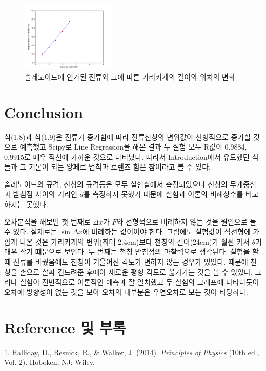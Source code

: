 \documentclass[a4paper]{article}
\begin{document}
		\begin{figure}[h]
			\centering
			\includegraphics[width=0.4\textwidth]{img/figure_2.png}
			\vspace{-0.5cm}
			\caption{솔레노이드에 인가된 전류와 그에 따른 가리키게의 길이와 위치의 변화}
		\end{figure}

	

\newpage




	\section{Conclusion}
	식(1.8)과 식(1.9)은 전류가 증가함에 따라 전류천칭의 변위값이 선형적으로 증가할 것으로 예측했고 Scipy로 Line Regression을 해본 결과 두 실험 모두 R값이 0.9884, 0.9915로 매우 직선에 가까운 것으로 나타났다.
	따라서 Introduction에서 유도했던 식들과 그 기본이 되는 앙페르 법칙과 로렌츠 힘은 참이라고 볼 수 있다. 

	솔레노이드의 규격, 천칭의 규격등은 모두 실험실에서 측정되었으나 천칭의 무게중심과 받침점 사이의 거리인 $d$를 측정하지 못했기 때문에 실험과 이론의 비례상수를 비교하지는 못했다. 

	오차분석을 해보면 첫 번째로 $\Delta{}x$가 $F$와 선형적으로 비례하지 않는 것을 원인으로 들 수 있다. 실제로는 $\sin{\Delta{}x}$에 비례하는 값이어야 한다.
	그럼에도 실험값이 직선형에 가깝게 나온 것은 가리키게의 변위(최대 2.4\si{cm})보다 천칭의 길이(24\si{cm})가 훨씬 커서 $\theta$가 매우 작기 떄문으로 보인다.
	두 번째는 천칭 받침점의 마찰력으로 생각된다.
	실험을 할 때 전류를 바꿨음에도 천칭이 기울어진 각도가 변하지 않는 경우가 있었다.
	때문에 천칭을 손으로 살짜 건드려준 후에야 새로운 평형 각도로 옮겨가는 것을 볼 수 있었다.
	그러나 실험이 전반적으로 이론적인 예측과 잘 일치했고 두 실험의 그래프에 나타나듯이 오차에 방향성이 없는 것을 보아 오차의 대부분은 우연오차로 보는 것이 타당하다.




\section{Reference 및 부록}
	1. Halliday, D., Resnick, R., \& Walker, J. (2014). {\it{}Principles of Physics} (10th ed., Vol. 2). Hoboken, NJ: Wiley.
	\\ 
\end{document}
